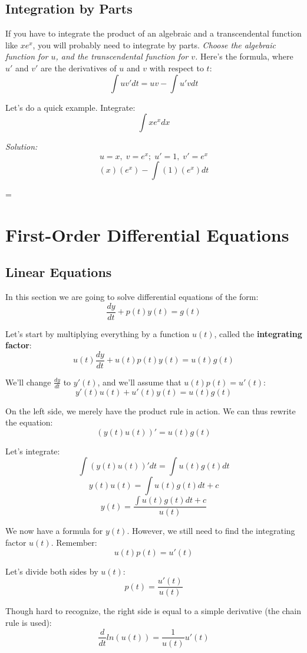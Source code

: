 \subsection{Integration by Parts}
If you have to integrate the product of an algebraic and a transcendental function like $xe^{x}$, you will probably need to integrate by parts. \textit{Choose the algebraic function for $u$, and the transcendental function for $v$.} Here's the formula, where $u'$ and $v'$ are the derivatives of $u$ and $v$ with respect to $t$:
$$\int uv'dt = uv - \int u'vdt$$

Let's do a quick example. Integrate:
$$\int xe^{x}dx$$

\pagebreak

\textit{Solution:}
$$u = x,\; v = e^{x};\; u' = 1,\; v' = e^{x}$$
$$(x)(e^{x}) - \int (1)(e^{x})dt$$
\begin{center}
	= 
\end{center}

\section{First-Order Differential Equations}
\subsection{Linear Equations}
In this section we are going to solve differential equations of the form: $$\frac{dy}{dt} + p(t)y(t) = g(t)$$

Let's start by multiplying everything by a function $u(t)$, called the \textbf{integrating factor}: $$u(t)\frac{dy}{dt} + u(t)p(t)y(t) = u(t)g(t)$$

We'll change $\frac{dy}{dt}$ to $y'(t)$, and we'll assume that $u(t)p(t)=u'(t)$: $$y'(t)u(t) + u'(t)y(t) = u(t)g(t)$$

On the left side, we merely have the product rule in action. We can thus rewrite the equation: $$(y(t)u(t))' = u(t)g(t)$$

Let's integrate:
$$\int (y(t)u(t))'dt = \int u(t)g(t)dt$$
$$y(t)u(t) = \int u(t)g(t)dt + c$$
$$y(t) = \frac{\int u(t)g(t)dt + c}{u(t)}$$

We now have a formula for $y(t)$. However, we still need to find the integrating factor $u(t)$. Remember: $$u(t)p(t)=u'(t)$$

Let's divide both sides by $u(t)$: $$p(t) = \frac{u'(t)}{u(t)}$$

Though hard to recognize, the right side is equal to a simple derivative (the chain rule is used):
$$\frac{d}{dt}ln(u(t)) = \frac{1}{u(t)}u'(t)$$

